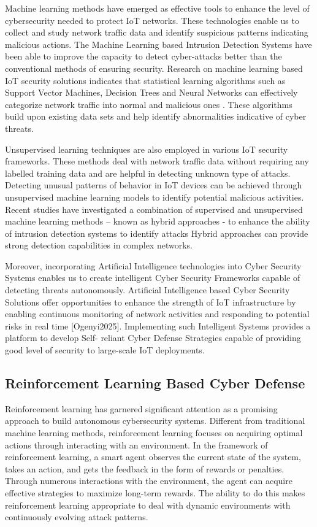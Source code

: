 \documentclass[12pt]{article}
\begin{document}
Machine learning methods have emerged as effective tools to enhance the level of cybersecurity needed to protect IoT networks. These technologies enable us to collect and study network traffic data and identify suspicious patterns indicating malicious actions. The Machine Learning based Intrusion Detection Systems have been able to improve the capacity to detect cyber-attacks better than the conventional methods of ensuring security. Research on machine learning based IoT security solutions indicates that statistical learning algorithms such as Support Vector Machines, Decision Trees and Neural Networks can effectively categorize network traffic into normal and malicious ones . These algorithms build upon existing data sets and help identify abnormalities indicative of cyber threats.

Unsupervised learning techniques are also employed in various IoT security frameworks. These methods deal with network traffic data without requiring any labelled training data and are helpful in detecting unknown type of attacks. Detecting unusual patterns of behavior in IoT devices can be achieved through unsupervised machine learning models to identify potential malicious activities. Recent studies have investigated a combination of supervised and unsupervised machine learning methods – known as hybrid approaches - to enhance the ability of intrusion detection systems to identify attacks  Hybrid approaches can provide strong detection capabilities in complex networks. 

Moreover, incorporating Artificial Intelligence technologies into Cyber Security Systems enables us to create intelligent Cyber Security Frameworks capable of detecting threats autonomously. Artificial Intelligence based Cyber Security Solutions offer opportunities to enhance the strength of IoT infrastructure by enabling continuous monitoring of network activities and responding to potential risks in real time [Ogenyi2025]. Implementing such Intelligent Systems provides a platform to develop Self- reliant Cyber Defense Strategies capable of providing good level of security to large-scale IoT deployments.\cite{Ahmed2025,Singh2024,Cevallos2023,Zhang2024,Khan2023}
\subsection{Reinforcement Learning Based Cyber Defense}
Reinforcement learning has garnered significant attention as a promising approach to build autonomous cybersecurity systems. Different from traditional machine learning methods, reinforcement learning focuses on acquiring optimal actions through interacting with an environment. In the framework of reinforcement learning, a smart agent observes the current state of the system, takes an action, and gets the feedback in the form of rewards or penalties. Through numerous interactions with the environment, the agent can acquire effective strategies to maximize long-term rewards. The ability to do this makes reinforcement learning appropriate to deal with dynamic environments with continuously evolving attack patterns. 
\end{document}
